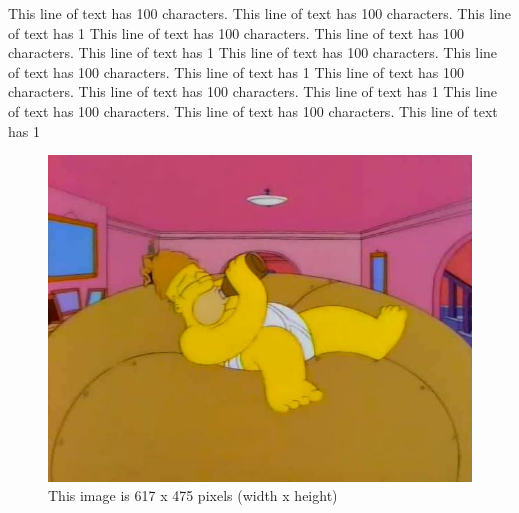 \documentclass[utf8]{FrontiersinVancouver} %
\begin{document}
This line of text has 100 characters. This line of text has 100 characters. This line of text has 1 
This line of text has 100 characters. This line of text has 100 characters. This line of text has 1 
This line of text has 100 characters. This line of text has 100 characters. This line of text has 1 
This line of text has 100 characters. This line of text has 100 characters. This line of text has 1 
This line of text has 100 characters. This line of text has 100 characters. This line of text has 1 


\begin{figure}[htbp]
        \begin{center}
        \includegraphics[width=\linewidth]{homer_giant_donut.jpg}
        \end{center}
    \caption{ This image is 617 x 475 pixels (width x height) }\label{fig:homer_giant_donut}
\end{figure}

\end{document}
